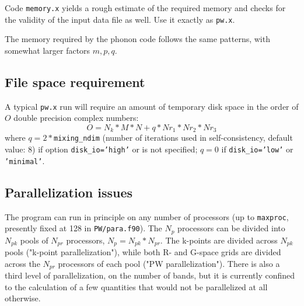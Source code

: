 \documentclass[12pt]{article}
\begin{document}
Code {\tt memory.x} yields a rough estimate of the required memory 
and checks for the validity of the input data file as well. Use it
exactly as {\tt pw.x}.

The memory required by the phonon code follows the same patterns,
with somewhat larger factors $m,p,q$.

\subsection{File space requirement}

A typical {\tt pw.x} run will require an amount of temporary disk space
in the order of $O$ double precision complex numbers:
\begin{equation}
     O = N_k*M*N + q*Nr_1*Nr_2*Nr_3
\end{equation}
where $q=2*${\tt mixing\_ndim} (number of iterations used in self-consistency,
default value: 8) if option {\tt disk\_io='high'} or is not specified;
$q=0$ if {\tt disk\_io='low'} or  {\tt 'minimal'}.

\subsection{Parallelization issues}

The program can run in principle on any number of processors
(up to {\tt maxproc}, presently fixed at 128 in {\tt PW/para.f90}). 
The $N_p$ processors can be divided into $N_{pk}$ pools of $N_{pr}$
processors, $N_p=N_{pk}*N_{pr}$. 
The k-points are divided across $N_{pk}$ pools ("k-point parallelization"), 
while both R- and G-space grids are divided across the $N_{pr}$ processors 
of each pool ("PW parallelization").
There is also a third level of parallelization, on the number of bands,
but it is currently confined to the calculation of a few quantities
that would not be parallelized at all otherwise.
\end{document}
